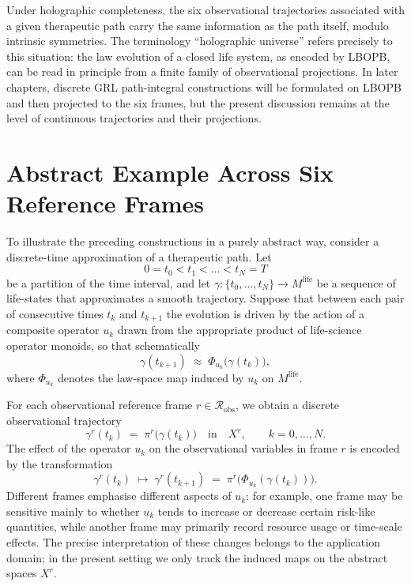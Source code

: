 \documentclass[11pt]{book}
\theoremstyle{plain}
\theoremstyle{definition}
\theoremstyle{remark}
\begin{document}
Under holographic completeness, the six observational trajectories
associated with a given therapeutic path carry the same information as
the path itself, modulo intrinsic symmetries. The terminology
``holographic universe'' refers precisely to this situation: the law
evolution of a closed life system, as encoded by LBOPB, can be read in
principle from a finite family of observational projections. In later
chapters, discrete GRL path-integral constructions will be formulated
on LBOPB and then projected to the six frames, but the present
discussion remains at the level of continuous trajectories and their
projections.

\section{Abstract Example Across Six Reference Frames}


To illustrate the preceding constructions in a purely abstract way,
consider a discrete-time approximation of a therapeutic path. Let
\[
  0 = t_{0} < t_{1} < \dots < t_{N} = T
\]
be a partition of the time interval, and let
$\gamma \colon \{t_{0},\dots,t_{N}\} \to M^{\mathrm{life}}$ be a
sequence of life-states that approximates a smooth trajectory. Suppose
that between each pair of consecutive times $t_{k}$ and $t_{k+1}$ the
evolution is driven by the action of a composite operator
$u_{k}$ drawn from the appropriate product of life-science operator
monoids, so that schematically
\[
  \gamma(t_{k+1}) \;\approx\;
  \Phi_{u_{k}}\bigl(\gamma(t_{k})\bigr),
\]
where $\Phi_{u_{k}}$ denotes the law-space map induced by $u_{k}$ on
$M^{\mathrm{life}}$.

For each observational reference frame
$r \in \mathcal{R}_{\mathrm{obs}}$, we obtain a discrete observational
trajectory
\[
  \gamma^{r}(t_{k}) \;=\; \pi^{r}\bigl(\gamma(t_{k})\bigr)
  \quad\text{in}\quad X^{r},
  \qquad k = 0,\dots,N.
\]
The effect of the operator $u_{k}$ on the observational variables in
frame $r$ is encoded by the transformation
\[
  \gamma^{r}(t_{k}) \;\mapsto\; \gamma^{r}(t_{k+1})
  \;=\; \pi^{r}\bigl(\Phi_{u_{k}}(\gamma(t_{k}))\bigr).
\]
Different frames emphasise different aspects of $u_{k}$: for example,
one frame may be sensitive mainly to whether $u_{k}$ tends to increase
or decrease certain risk-like quantities, while another frame may
primarily record resource usage or time-scale effects. The precise
interpretation of these changes belongs to the application domain; in
the present setting we only track the induced maps on the abstract
spaces $X^{r}$.
\end{document}

